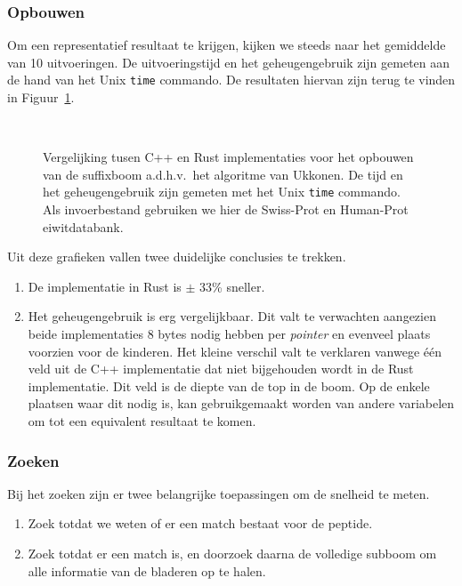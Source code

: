 \subsubsection{Opbouwen}
Om een representatief resultaat te krijgen, kijken we steeds naar het gemiddelde van 10 uitvoeringen.
De uitvoeringstijd en het geheugengebruik zijn gemeten aan de hand van het Unix \texttt{time} commando.
De resultaten hiervan zijn terug te vinden in Figuur~\ref{fig:tree_building}.
\begin{figure}[H]
    \centering
    \\[4ex] %

    \caption{Vergelijking tusen C++ en Rust implementaties voor het opbouwen van de suffixboom a.d.h.v.~het algoritme van Ukkonen. De tijd en het geheugengebruik zijn gemeten met het Unix \texttt{time} commando. Als invoerbestand gebruiken we hier de Swiss-Prot en Human-Prot eiwitdatabank.}\label{fig:tree_building}
\end{figure}

Uit deze grafieken vallen twee duidelijke conclusies te trekken.
\begin{enumerate}
    \item De implementatie in Rust is $\pm$ 33\% sneller.
    \item Het geheugengebruik is erg vergelijkbaar.
    Dit valt te verwachten aangezien beide implementaties 8 bytes nodig hebben per \textit{pointer} en evenveel plaats voorzien voor de kinderen.
    Het kleine verschil valt te verklaren vanwege één veld uit de C++ implementatie dat niet bijgehouden wordt in de Rust implementatie.
    Dit veld is de diepte van de top in de boom.
    Op de enkele plaatsen waar dit nodig is, kan gebruikgemaakt worden van andere variabelen om tot een equivalent resultaat te komen.
\end{enumerate}

\subsubsection{Zoeken}
Bij het zoeken zijn er twee belangrijke toepassingen om de snelheid te meten.
\begin{enumerate}
    \item Zoek totdat we weten of er een match bestaat voor de peptide.
    \item Zoek totdat er een match is, en doorzoek daarna de volledige subboom om alle informatie van de bladeren op te halen.

\end{enumerate}

